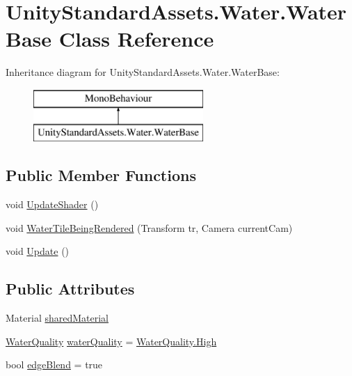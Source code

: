 \hypertarget{class_unity_standard_assets_1_1_water_1_1_water_base}{}\section{Unity\+Standard\+Assets.\+Water.\+Water\+Base Class Reference}
\label{class_unity_standard_assets_1_1_water_1_1_water_base}
Inheritance diagram for Unity\+Standard\+Assets.\+Water.\+Water\+Base\+:\begin{figure}[H]
\begin{center}
\leavevmode
\includegraphics[height=2.000000cm]{class_unity_standard_assets_1_1_water_1_1_water_base}
\end{center}
\end{figure}
\subsection*{Public Member Functions}
\begin{DoxyCompactItemize}
\item 
void \mbox{\hyperlink{class_unity_standard_assets_1_1_water_1_1_water_base_a042c631313c1ec111b50ba4be3ee4c49}{Update\+Shader}} ()
\item 
void \mbox{\hyperlink{class_unity_standard_assets_1_1_water_1_1_water_base_a9496cf672bf0909b0496521aaa1c9029}{Water\+Tile\+Being\+Rendered}} (Transform tr, Camera current\+Cam)
\item 
void \mbox{\hyperlink{class_unity_standard_assets_1_1_water_1_1_water_base_a08a8f68c9598589516d153ab6c9fd5eb}{Update}} ()
\end{DoxyCompactItemize}
\subsection*{Public Attributes}
\begin{DoxyCompactItemize}
\item 
Material \mbox{\hyperlink{class_unity_standard_assets_1_1_water_1_1_water_base_a7aff509c9ae54c5a455fa2056111dc4d}{shared\+Material}}
\item 
\mbox{\hyperlink{namespace_unity_standard_assets_1_1_water_ac23a9da55bc8ba734d644ff4cc1f15f5}{Water\+Quality}} \mbox{\hyperlink{class_unity_standard_assets_1_1_water_1_1_water_base_a55893c3ad6b86eef9d154125f16abc08}{water\+Quality}} = \mbox{\hyperlink{namespace_unity_standard_assets_1_1_water_ac23a9da55bc8ba734d644ff4cc1f15f5a655d20c1ca69519ca647684edbb2db35}{Water\+Quality.\+High}}
\item 
bool \mbox{\hyperlink{class_unity_standard_assets_1_1_water_1_1_water_base_a23c9f9595d0fa2ab78192d0fa014d61e}{edge\+Blend}} = true
\end{DoxyCompactItemize}


